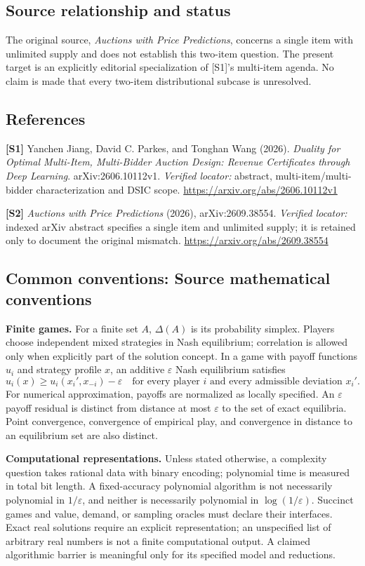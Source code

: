 \documentclass[11pt,a4paper]{article}
\begin{document}
\subsection*{Source relationship and status}
The original source, \emph{Auctions with Price Predictions}, concerns a single item with unlimited supply and does not establish this two-item question. The present target is an explicitly editorial specialization of [S1]'s multi-item agenda. No claim is made that every two-item distributional subcase is unresolved.
\subsection*{References}
\begingroup\footnotesize\raggedright
\textbf{[S1]} Yanchen Jiang, David C. Parkes, and Tonghan Wang (2026). \emph{Duality for Optimal Multi-Item, Multi-Bidder Auction Design: Revenue Certificates through Deep Learning}. arXiv:2606.10112v1. \textit{Verified locator:} abstract, multi-item/multi-bidder characterization and DSIC scope. \url{https://arxiv.org/abs/2606.10112v1}
\par\textbf{[S2]} \emph{Auctions with Price Predictions} (2026), arXiv:2609.38554. \textit{Verified locator:} indexed arXiv abstract specifies a single item and unlimited supply; it is retained only to document the original mismatch. \url{https://arxiv.org/abs/2609.38554}
\par\endgroup

\subsection*{Common conventions: Source mathematical conventions}

\textbf{Finite games.} For a finite set $A$, $\Delta(A)$ is its probability
simplex. Players choose independent mixed strategies in Nash equilibrium;
correlation is allowed only when explicitly part of the solution concept.
In a game with payoff functions $u_i$ and strategy profile $x$, an additive
$\varepsilon$ Nash equilibrium satisfies
\[
 u_i(x)\geq u_i(x_i',x_{-i})-\varepsilon
 \quad\text{for every player $i$ and every admissible deviation $x_i'$}.
\]
For numerical approximation, payoffs are normalized as locally specified.
An $\varepsilon$ payoff residual is distinct from distance at most
$\varepsilon$ to the set of exact equilibria. Point convergence, convergence
of empirical play, and convergence in distance to an equilibrium set are
also distinct.

\textbf{Computational representations.} Unless stated otherwise, a complexity
question takes rational data with binary encoding; polynomial time is measured
in total bit length. A fixed-accuracy polynomial algorithm is not necessarily
polynomial in $1/\varepsilon$, and neither is necessarily polynomial in
$\log(1/\varepsilon)$. Succinct games and value, demand, or sampling oracles
must declare their interfaces. Exact real solutions require an explicit
representation; an unspecified list of arbitrary real numbers is not a
finite computational output. A claimed algorithmic barrier is meaningful
only for its specified model and reductions.
\end{document}

